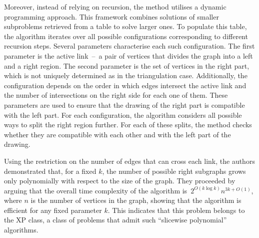 Moreover, instead of relying on recursion, the method utilises a dynamic programming approach. This framework combines solutions of smaller subproblems retrieved from a table to solve larger ones. To populate this table, the algorithm iterates over all possible configurations corresponding to different recursion steps. Several parameters characterise each such configuration. The first parameter is the active link~--~a pair of vertices that divides the graph into a left and a right region. The second parameter is the set of vertices in the right part, which is not uniquely determined as in the triangulation case. Additionally, the configuration depends on the order in which edges intersect the active link and the number of intersections on the right side for each one of them. These parameters are used to ensure that the drawing of the right part is compatible with the left part. For each configuration, the algorithm considers all possible ways to split the right region further. For each of these splits, the method checks whether they are compatible with each other and with the left part of the drawing.

Using the restriction on the number of edges that can cross each link, the authors demonstrated that, for a fixed \(k\), the number of possible right subgraphs grows only polynomially with respect to the size of the graph. They proceeded by arguing that the overall time complexity of the algorithm is~\(2^{O(k \log k)}n^{3k + O(1)}\), where \(n\) is the number of vertices in the graph, showing that the algorithm is efficient for any fixed parameter \(k\). This indicates that this problem belongs to the XP class, a class of problems that admit such ``slicewise polynomial'' algorithms.
